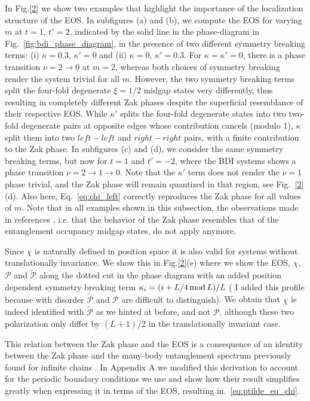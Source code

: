 \documentclass[twocolumn,amsmath,longbibliography,amssymb,superscriptaddress]{revtex4-1}
\newcommand{\carlos}[1]{{\color{red} #1}}
\begin{document}
In Fig.\ref{2} we show two examples that highlight the importance of the localization structure of the EOS. 
In subfigures (a) and (b), we compute the EOS for varying $m$ at  $t=1$, $t'=2$, indicated by the solid line  in the phase-diagram in Fig.~\ref{fig:bdi_phase_diagram}, in the presence of two different symmetry breaking terms: (i) $\kappa =0.3$, $\kappa'=0$ and (ii) $\kappa=0$, $\kappa'=0.3$.  
For $\kappa=\kappa'=0$, there is a phase transition $\nu = 2 \rightarrow 0 $ at $m=2$, whereas both choices of symmetry breaking render the system trivial  for all $m$.
However, the two symmetry breaking terms split the four-fold degenerate $\xi=1/2$ midgap states very differently, thus resulting in completely different Zak phases despite the superficial resemblance of their respective EOS.  
While $\kappa'$ splits the four-fold degenerate states into two two-fold degenerate pairs at opposite edges whose contribution cancels (modulo 1), $\kappa$ split them into two $left-left$ and $right-right$ pairs, with a finite contribution to the Zak phase. 
In subfigures (c) and (d), we consider the same symmetry breaking terms, but now for $t=1$ and $t'=-2$, where the BDI systems shows a phase transition  $\nu=2\rightarrow 1\rightarrow 0$. 
Note that the $\kappa'$ term does not render the $\nu=1$ phase trivial, and the Zak phase will remain quantized in that region, see Fig.~\ref{2}(d). 
Also here, Eq.~\ref{eq:chi_left} correctly reproduces the Zak phase for all values of $m$. 
Note that in all examples shown in this subsection, the observations made in references \cite{Huang2012,Huang2012-2}, i.e. that the behavior of the Zak phase resembles that of the entanglement occupancy midgap states, do not apply anymore. 

Since $\chi$ is naturally defined in position space it is also valid for systems without translationally invariance. We show this in Fig.\ref{2}(e) where we show the EOS, $\chi$, $\mathcal{P}$ and $\tilde{\mathcal{P}}$ along the dotted cut in the phase diagram with an added position dependent symmetry breaking term $\kappa_i = (i+L/4 \, {\rm mod}\, L)/L$ (\carlos{I added this profile because with disorder $\tilde{\mathcal{P}}$ and $\mathcal{P}$ are difficult to distinguish}). We obtain that $\chi$ is indeed identified with $\tilde{\mathcal{P}}$ as we hinted at before, and not $\mathcal{P}$, although these two polarization only differ by $(L+1)/2$ in the translationally invariant case. 


This relation between the Zak phase and the EOS is a consequence of an identity between the Zak phase and the many-body entanglement spectrum previously found for infinite chains \cite{Zaletel2014}. In Appendix A we modified this derivation to account for the periodic boundary conditions we use and show how their result simplifies greatly when expressing it in terms of the EOS, resulting in.~\eqref{eq:ptilde_eq_chi}.
\end{document}
